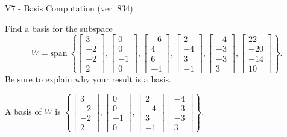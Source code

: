 \begin{exercise}
  \begin{exerciseTitle}V7 - Basis Computation (ver. 834)\end{exerciseTitle}
  \begin{exerciseStatement}
    Find a basis for the subspace 
\[W=\mathrm{span}\ \left\{\left[\begin{array}{r}
3 \\
-2 \\
-2 \\
2
\end{array}\right] , \left[\begin{array}{r}
0 \\
0 \\
-1 \\
0
\end{array}\right] , \left[\begin{array}{r}
-6 \\
4 \\
6 \\
-4
\end{array}\right] , \left[\begin{array}{r}
2 \\
-4 \\
3 \\
-1
\end{array}\right] , \left[\begin{array}{r}
-4 \\
-3 \\
-3 \\
3
\end{array}\right] , \left[\begin{array}{r}
22 \\
-20 \\
-14 \\
10
\end{array}\right]\right\}.\]
 Be sure to explain why your result is a basis.


  \end{exerciseStatement}
  \begin{exerciseAnswer}
   A basis of \(W\) is  \(\left\{\left[\begin{array}{r}
3 \\
-2 \\
-2 \\
2
\end{array}\right] , \left[\begin{array}{r}
0 \\
0 \\
-1 \\
0
\end{array}\right] , \left[\begin{array}{r}
2 \\
-4 \\
3 \\
-1
\end{array}\right] \left[\begin{array}{r}
-4 \\
-3 \\
-3 \\
3
\end{array}\right]\right\}\).
  


  \end{exerciseAnswer}
\end{exercise}